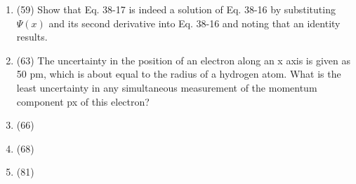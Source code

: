 \documentclass[fleqn]{article}
\begin{document}
\begin{enumerate}
    \item (59) Show that Eq. 38-17 is indeed a solution of Eq. 38-16 by substituting $\Psi(x)$ and its second derivative into Eq. 38-16 and noting
    that an identity results.


    \item (63) The uncertainty in the position of an electron along an x axis is given as 50 pm, which is about equal to the radius of a hydrogen atom.
    What is the least uncertainty in any simultaneous measurement of the
    momentum component px of this electron?


    \item (66) 


    \item (68) 


    \item (81) 


  \end{enumerate}
\end{document}
